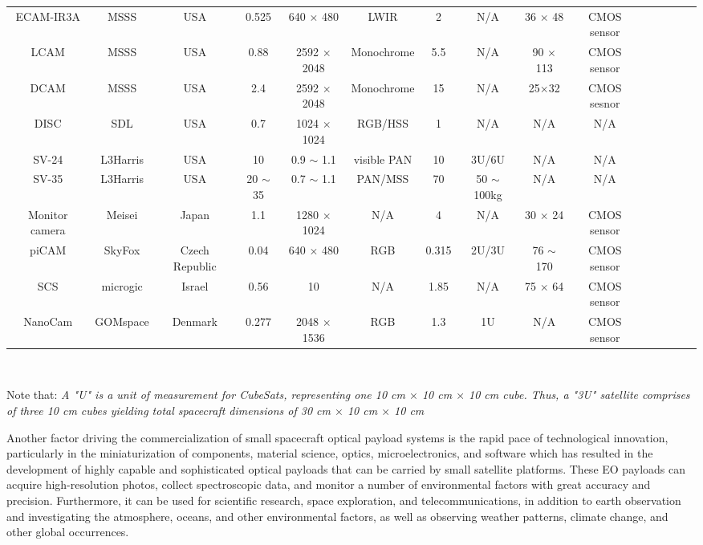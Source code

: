 \documentclass[final,5p,times,twocolumn]{elsarticle}
\begin{document}
\begin{table}
{\begin{tabular}{c c c c c c c c c c c c c c c}
			ECAM-IR3A & MSSS & USA & 0.525 & 640 $\times$ 480 &  LWIR & 2 &  N/A &  36 $\times$ 48 & CMOS sensor  & \citep{malin2023}\\    
			LCAM & MSSS & USA & 0.88 & 2592 $\times$ 2048 &  Monochrome & 5.5 &  N/A &90 $\times$ 113 & CMOS sensor & \citep{malin2023}\\  
			DCAM & MSSS & USA & 2.4 & 2592 $\times$ 2048 & Monochrome & 15 &  N/A & 25$\times$32 & CMOS  sesnor & \citep{malin2023}\\  
			DISC & SDL & USA & 0.7 & 1024 $\times$ 1024 &  RGB/HSS & 1 &  N/A & N/A & N/A & \citep{sdl2023}\\
			SV-24 & L3Harris & USA & 10 & 0.9 $\sim$  1.1 &  visible PAN & 10 & 3U/6U & N/A & N/A & \citep{harris2023}\\
			SV-35 & L3Harris & USA & 20 $\sim$ 35 & 0.7 $\sim$ 1.1 &  PAN/MSS & 70 &  50 $\sim$ 100kg & N/A & N/A & \citep{harris2023}\\
			Monitor camera & Meisei & Japan & 1.1 & 1280 $\times$ 1024 & N/A & 4 & N/A & 30 $\times$ 24 & CMOS sensor &  \citep{meisei2023}\\ 
			piCAM & SkyFox & Czech Republic & 0.04 & 640 $\times$ 480&  RGB & 0.315 &  2U/3U & 76 $\sim$ 170 & CMOS sensor & \citep{skyfox2023}\\ 
			SCS & microgic & Israel & 0.56 & 10 &  N/A & 1.85 &  N/A & 75 $\times$ 64 & CMOS  sensor & \citep{micro2023}\\
			NanoCam  & GOMspace & Denmark & 0.277 & 2048 $\times$ 1536 &  RGB & 1.3 &  1U & N/A & CMOS sensor  & \citep{gomspace2023}\\
			\hline
		\end{tabular}
	}
	\label{table:nonlin} %
	\vspace{1ex}\\
	\raggedright{Note that: \textit{A "U" is a unit of measurement for CubeSats, representing one 10 cm $\times$ 10 cm $\times$ 10 cm cube. Thus, a "3U" satellite comprises of three 10 cm cubes yielding total spacecraft dimensions of 30 cm $\times$ 10 cm $\times$ 10 cm}}
	
\end{table}
Another factor driving the commercialization of small spacecraft optical payload systems is the rapid pace of technological innovation, particularly in the miniaturization of components, material science, optics, microelectronics, and software which has resulted in the development of highly capable and sophisticated optical payloads that can be carried by small satellite platforms. These EO payloads can acquire high-resolution photos, collect spectroscopic data, and monitor a number of environmental factors with great accuracy and precision. Furthermore, it can be used for scientific research, space exploration, and telecommunications, in addition to earth observation and investigating the atmosphere, oceans, and other environmental factors, as well as observing weather patterns, climate change, and other global occurrences.\\
\end{document}
